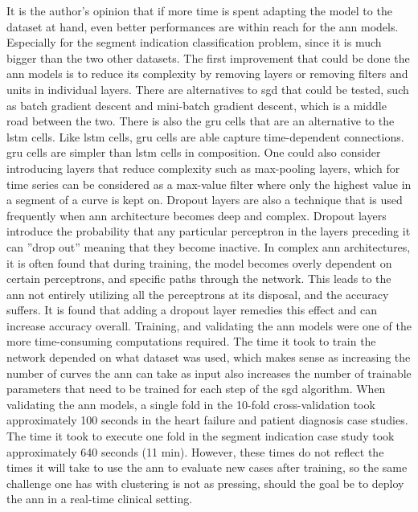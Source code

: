 It is the author's opinion that if more time is spent adapting the model to the dataset at hand, even better performances are within reach for the \acrshort{ann} models. Especially for the segment indication classification problem, since it is much bigger than the two other datasets. The first improvement that could be done the \acrshort{ann} models is to reduce its complexity by removing layers or removing filters and units in individual layers. There are alternatives to \acrshort{sgd} that could be tested, such as batch gradient descent and mini-batch gradient descent, which is a middle road between the two. There is also the \acrfull{gru} cells that are an alternative to the \acrshort{lstm} cells. Like \acrshort{lstm} cells, \acrshort{gru} cells are able capture time-dependent connections. \acrshort{gru} cells are simpler than \acrshort{lstm} cells in composition. One could also consider introducing layers that reduce complexity such as max-pooling layers, which for time series can be considered as a max-value filter where only the highest value in a segment of a curve is kept on. Dropout layers are also a technique that is used frequently when \acrshort{ann} architecture becomes deep and complex. Dropout layers introduce the probability that any particular perceptron in the layers preceding it can ''drop out'' meaning that they become inactive. In complex \acrshort{ann} architectures, it is often found that during training, the model becomes overly dependent on certain perceptrons, and specific paths through the network. This leads to the \acrshort{ann} not entirely utilizing all the perceptrons at its disposal, and the accuracy suffers. It is found that adding a dropout layer remedies this effect and can increase accuracy overall. \bigskip
Training, and validating the \acrshort{ann} models were one of the more time-consuming computations required. The time it took to train the network depended on what dataset was used, which makes sense as increasing the number of curves the \acrshort{ann} can take as input also increases the number of trainable parameters that need to be trained for each step of the \acrshort{sgd} algorithm. When validating the \acrshort{ann} models, a single fold in the 10-fold cross-validation took approximately 100 seconds in the heart failure and patient diagnosis case studies. The time it took to execute one fold in the segment indication case study took approximately 640 seconds (11 min). However, these times do not reflect the times it will take to use the \acrshort{ann} to evaluate new cases after training, so the same challenge one has with clustering is not as pressing, should the goal be to deploy the \acrshort{ann} in a real-time clinical setting.

